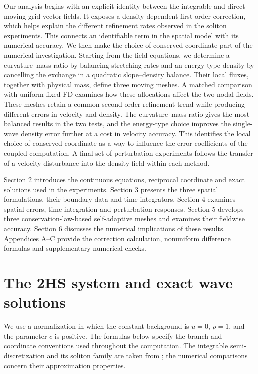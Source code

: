 \documentclass{article}
\begin{document}
Our analysis begins with an explicit identity between the integrable and direct moving-grid vector fields. It exposes a density-dependent first-order correction, which helps explain the different refinement rates observed in the soliton experiments. This connects an identifiable term in the spatial model with its numerical accuracy. We then make the choice of conserved coordinate part of the numerical investigation. Starting from the field equations, we determine a curvature--mass ratio by balancing stretching rates and an energy-type density by cancelling the exchange in a quadratic slope--density balance. Their local fluxes, together with physical mass, define three moving meshes. A matched comparison with uniform fixed FD examines how these allocations affect the two nodal fields. These meshes retain a common second-order refinement trend while producing different errors in velocity and density. The curvature--mass ratio gives the most balanced results in the two tests, and the energy-type choice improves the single-wave density error further at a cost in velocity accuracy. This identifies the local choice of conserved coordinate as a way to influence the error coefficients of the coupled computation. A final set of perturbation experiments follows the transfer of a velocity disturbance into the density field within each method.

Section 2 introduces the continuous equations, reciprocal coordinate and exact solutions used in the experiments. Section 3 presents the three spatial formulations, their boundary data and time integrators. Section 4 examines spatial errors, time integration and perturbation responses. Section 5 develops three conservation-law-based self-adaptive meshes and examines their fieldwise accuracy. Section 6 discusses the numerical implications of these results. Appendices A--C provide the correction calculation, nonuniform difference formulas and supplementary numerical checks.


\FloatBarrier
\section{The 2HS system and exact wave solutions}

We use a normalization in which the constant background is \(u=0\), \(\rho=1\), and the parameter \(c\) is positive. The formulas below specify the branch and coordinate conventions used throughout the computation. The integrable semi-discretization and its soliton family are taken from \cite{hori2026}; the numerical comparisons concern their approximation properties.
\end{document}

